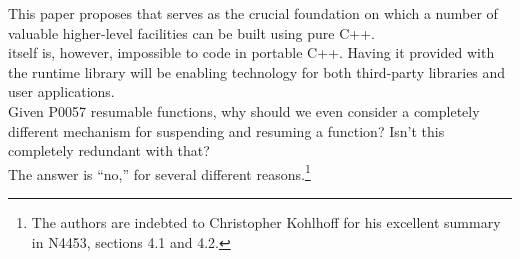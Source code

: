 This paper proposes \ectx that serves as the crucial foundation on which a
number of valuable higher-level facilities can be built using pure C++.\\
\newline
\ectx itself is, however, impossible to code in portable C++. Having it provided
with the runtime library will be enabling technology for both third-party
libraries and user applications.\\

Given P0057 resumable functions, why should we even consider a completely
different mechanism for suspending and resuming a function? Isn't this
completely redundant with that?\\
\newline
The answer is ``no,'' for several different reasons.\footnote{The authors are
indebted to Christopher Kohlhoff for his excellent summary in
N4453,\cite{N4453} sections 4.1 and 4.2.}

